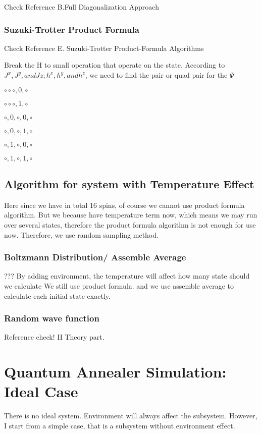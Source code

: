 \documentclass[twoside,a4paper,article]{combine}
\begin{document}
Check Reference \cite{DeRaedt2004} B.Full Diagonalization Approach

\subsubsection{Suzuki-Trotter Product Formula}
Check Reference \cite{DeRaedt2004}  E. Suzuki-Trotter Product-Formula Algorithms

Break the H to small operation that operate on the state. According to $J^x , J^y, and Jz; h^x, h^y, and h^z$, we need to find the pair or quad pair for the $\Psi$

$\circ \circ \circ ,0, \circ$

$\circ \circ \circ ,1, \circ$

$\circ ,0, \circ ,0, \circ$

$\circ ,0, \circ ,1, \circ$

$\circ ,1, \circ ,0, \circ$

$\circ ,1, \circ ,1, \circ$

\subsection{Algorithm for system with Temperature Effect}
Here since we have in total 16 spins, of course we cannot use product formula algorithm. But we because have temperature term now, which means we may run over several states, therefore the product formula algorithm is not enough for use now. Therefore, we use random sampling method.
\subsubsection{Boltzmann Distribution/ Assemble Average}
???	By adding environment, the temperature will affect how many state should we calculate
We still use product formula. and we use assemble average to calculate each initial state exactly.
\subsubsection{Random wave function}
Reference check! II Theory part.
\cite{Hams2000} 





\section{Quantum Annealer Simulation: Ideal Case}
	There is no ideal system. Environment will always affect the subsystem. However, I start from a simple case, that is a subsystem without environment effect. 
\end{document}
